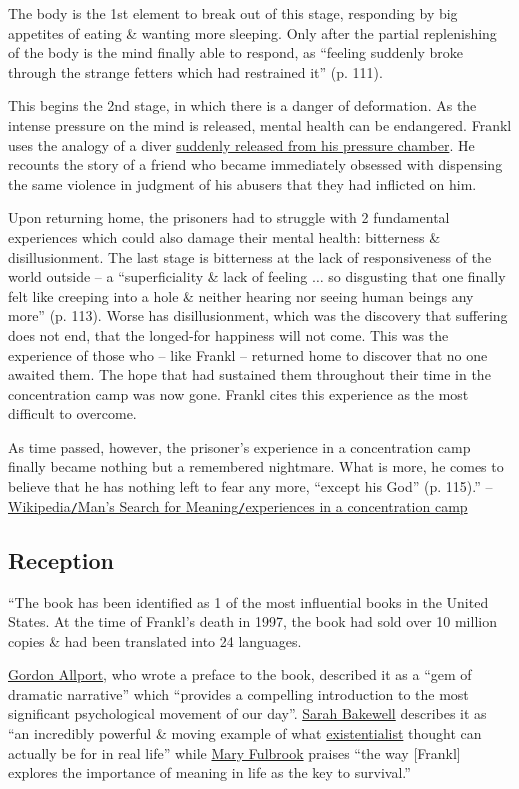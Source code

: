 \documentclass[oneside]{book}
\numberwithin{equation}{section}
\begin{document}
The body is the 1st element to break out of this stage, responding by big appetites of eating \& wanting more sleeping. Only after the partial replenishing of the body is the mind finally able to respond, as ``feeling suddenly broke through the strange fetters which had restrained it'' (p. 111).

This begins the 2nd stage, in which there is a danger of deformation. As the intense pressure on the mind is released, mental health can be endangered. Frankl uses the analogy of a diver \href{https://en.wikipedia.org/wiki/Decompression_sickness}{suddenly released from his pressure chamber}. He recounts the story of a friend who became immediately obsessed with dispensing the same violence in judgment of his abusers that they had inflicted on him.

Upon returning home, the prisoners had to struggle with 2 fundamental experiences which could also damage their mental health: bitterness \& disillusionment. The last stage is bitterness at the lack of responsiveness of the world outside -- a ``superficiality \& lack of feeling $\ldots$ so disgusting that one finally felt like creeping into a hole \& neither hearing nor seeing human beings any more'' (p. 113). Worse has disillusionment, which was the discovery that suffering does not end, that the longed-for happiness will not come. This was the experience of those who -- like Frankl -- returned home to discover that no one awaited them. The hope that had sustained them throughout their time in the concentration camp was now gone. Frankl cites this experience as the most difficult to overcome.

As time passed, however, the prisoner's experience in a concentration camp finally became nothing but a remembered nightmare. What is more, he comes to believe that he has nothing left to fear any more, ``except his God'' (p. 115).'' -- \href{https://en.wikipedia.org/wiki/Man%27s_Search_for_Meaning#Experiences_in_a_concentration_camp}{Wikipedia\texttt{/}Man's Search for Meaning\texttt{/}experiences in a concentration camp}

\subsection{Reception}
``The book has been identified as 1 of the most influential books in the United States. At the time of Frankl's death in 1997, the book had sold over 10 million copies \& had been translated into 24 languages.

\href{https://en.wikipedia.org/wiki/Gordon_Allport}{Gordon Allport}, who wrote a preface to the book, described it as a ``gem of dramatic narrative'' which ``provides a compelling introduction to the most significant psychological movement of our day''. \href{https://en.wikipedia.org/wiki/Sarah_Bakewell}{Sarah Bakewell} describes it as ``an incredibly powerful \& moving example of what \href{https://en.wikipedia.org/wiki/Existentialist}{existentialist} thought can actually be for in real life'' while \href{https://en.wikipedia.org/wiki/Mary_Fulbrook}{Mary Fulbrook} praises ``the way [Frankl] explores the importance of meaning in life as the key to survival.''
\end{document}
